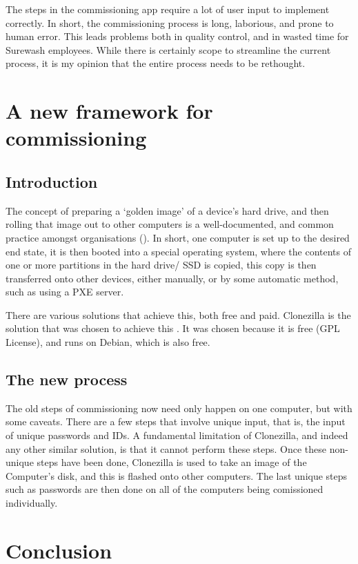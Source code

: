 The steps in the commissioning app require a lot of user input to implement correctly. In short, the commissioning process is long, laborious, and prone to human error. This leads problems both in quality control, and in wasted time for Surewash employees. While there is certainly scope to streamline the current process, it is my opinion that the entire process needs to be rethought.

\section{A new framework for commissioning}
    \subsection{Introduction}
    The concept of preparing a `golden image' of a device's hard drive, and then rolling that image out to other computers is a well-documented, and common practice amongst organisations (\cite{msftdeployment}). In short, one computer is set up to the desired end state, it is then booted into a special operating system, where the contents of one or more partitions in the hard drive/ SSD is copied, this copy is then transferred onto other devices, either manually, or by some automatic method, such as using a PXE server.

    There are various solutions that achieve this, both free and paid. Clonezilla is the solution that was chosen to achieve this \cite{clonezilla}. It was chosen because it is free (GPL License), and runs on Debian, which is also free.
    \subsection{The new process}
    The old steps of commissioning now need only happen on one computer, but with some caveats. There are a few steps that involve unique input, that is, the input of unique passwords and IDs. A fundamental limitation of Clonezilla, and indeed any other similar solution, is that it cannot perform these steps. Once these non-unique steps have been done, Clonezilla is used to take an image of the Computer's disk, and this is flashed onto other computers. The last unique steps such as passwords are then done on all of the computers being comissioned individually.

    \section{Conclusion}
